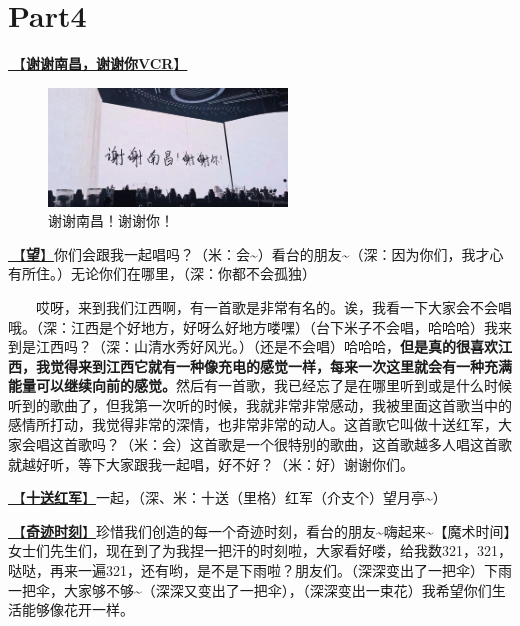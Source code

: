 \documentclass[]{ctexbook}
\begin{document}
\section{Part4}\label{nanchang-20241123-part4}

\hyperref[thank-you-vcr]{🎥【\textbf{谢谢南昌，谢谢你VCR}】}

\begin{figure}

{\centering \includegraphics[width=180pt]{img/nanchang-20241123/thank-nanchang} 

}

\caption{谢谢南昌！谢谢你！}\label{fig:unnamed-chunk-130}
\end{figure}

\hyperref[hope]{🎵【\textbf{望}】}你们会跟我一起唱吗？（米：会\textasciitilde）看台的朋友\textasciitilde（深：因为你们，我才心有所住。）无论你们在哪里，（深：你都不会孤独）

  哎呀，来到我们江西啊，有一首歌是非常有名的。诶，我看一下大家会不会唱哦。（深：江西是个好地方，好呀么好地方喽嘿）（台下米子不会唱，哈哈哈）我来到是江西吗？（深：山清水秀好风光。）（还是不会唱）哈哈哈，\textbf{但是真的很喜欢江西，我觉得来到江西它就有一种像充电的感觉一样，每来一次这里就会有一种充满能量可以继续向前的感觉。}然后有一首歌，我已经忘了是在哪里听到或是什么时候听到的歌曲了，但我第一次听的时候，我就非常非常感动，我被里面这首歌当中的感情所打动，我觉得非常的深情，也非常非常的动人。这首歌它叫做十送红军，大家会唱这首歌吗？（米：会）这首歌是一个很特别的歌曲，这首歌越多人唱这首歌就越好听，等下大家跟我一起唱，好不好？（米：好）谢谢你们。

\hyperref[Seeing-off-the-Red-Amy]{🎵【\textbf{十送红军}】}一起，（深、米：十送（里格）红军（介支个）望月亭\textasciitilde）

\hyperref[magic-moment]{🎵【\textbf{奇迹时刻}】}珍惜我们创造的每一个奇迹时刻，看台的朋友\textasciitilde 嗨起来\textasciitilde【魔术时间】女士们先生们，现在到了为我捏一把汗的时刻啦，大家看好喽，给我数321，321，哒哒，再来一遍321，还有哟，是不是下雨啦？朋友们。（深深变出了一把伞）下雨一把伞，大家够不够\textasciitilde（深深又变出了一把伞），（深深变出一束花）我希望你们生活能够像花开一样。
\end{document}

